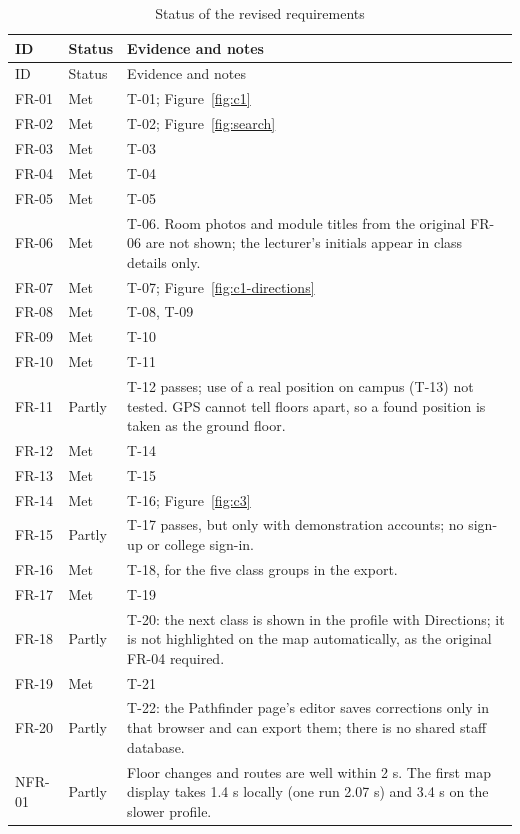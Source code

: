 \documentclass[12pt,a4paper]{report}
\newcommand{\tablespacing}{\singlespacing\small}
\begin{document}
{\tablespacing
\begin{longtable}{p{1.4cm}p{1.9cm}p{10.4cm}}
\caption{Status of the revised requirements}\label{tab:status}\\
\toprule
ID & Status & Evidence and notes \\
\midrule\endfirsthead
\toprule
ID & Status & Evidence and notes \\
\midrule\endhead
\bottomrule\endfoot
FR-01 & Met & T-01; Figure~\ref{fig:c1} \\
FR-02 & Met & T-02; Figure~\ref{fig:search} \\
FR-03 & Met & T-03 \\
FR-04 & Met & T-04 \\
FR-05 & Met & T-05 \\
FR-06 & Met & T-06. Room photos and module titles from the original FR-06 are not shown; the lecturer's initials appear in class details only. \\
FR-07 & Met & T-07; Figure~\ref{fig:c1-directions} \\
FR-08 & Met & T-08, T-09 \\
FR-09 & Met & T-10 \\
FR-10 & Met & T-11 \\
FR-11 & Partly & T-12 passes; use of a real position on campus (T-13) not tested. GPS cannot tell floors apart, so a found position is taken as the ground floor. \\
FR-12 & Met & T-14 \\
FR-13 & Met & T-15 \\
FR-14 & Met & T-16; Figure~\ref{fig:c3} \\
FR-15 & Partly & T-17 passes, but only with demonstration accounts; no sign-up or college sign-in. \\
FR-16 & Met & T-18, for the five class groups in the export. \\
FR-17 & Met & T-19 \\
FR-18 & Partly & T-20: the next class is shown in the profile with Directions; it is not highlighted on the map automatically, as the original FR-04 required. \\
FR-19 & Met & T-21 \\
FR-20 & Partly & T-22: the Pathfinder page's editor saves corrections only in that browser and can export them; there is no shared staff database. \\
NFR-01 & Partly & Floor changes and routes are well within 2 s. The first map display takes 1.4 s locally (one run 2.07 s) and 3.4 s on the slower profile. \\

\end{longtable}}
\end{document}
